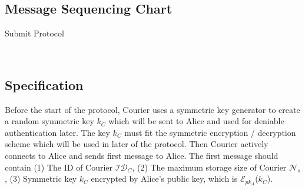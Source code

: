 \subsection{Message Sequencing Chart}
\begin{msc}{Submit Protocol}
\setlength{\instdist}{3\instdist}
\setlength{\envinstdist}{2.4\envinstdist}
\setlength{\levelheight}{1.5\levelheight}

\nextlevel[2]
\nextlevel
{}
\nextlevel[6]
\nextlevel
{}
\nextlevel[4]
\nextlevel
{}
\nextlevel
\end{msc}
\\


\subsection{Specification}
Before the start of the protocol, Courier uses a symmetric key generator to create a random symmetric key $k_C$ which will be sent to Alice and used for deniable authentication later. The key $ k_C $ must fit the symmetric encryption / decryption scheme which will be used in  later of the protocol. Then Courier actively connects to Alice and sends first message to Alice. The first message should contain (1) The ID of Courier $\mathcal{ID}_C$, (2) The maximum storage size of Courier $ \mathcal{N}_s $, (3) Symmetric key $k_C$ encrypted by Alice's public key, which is $\mathcal{E}_{pk_A}$($k_C$).

